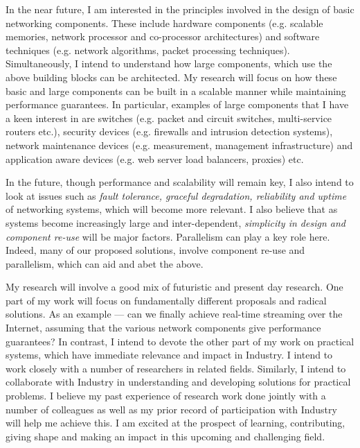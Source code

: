 \documentclass[10pt]{article}
\begin{document}
\begin{small}
In the near future, I am interested in the 
principles involved in the design of basic networking 
components. These include
hardware components (e.g. scalable memories, 
network processor and co-processor architectures) and 
software techniques (e.g. network algorithms, packet processing 
techniques). 
  Simultaneously, I intend to understand how large components, which use
the above building blocks can be architected.
My research will focus on how these basic and large
components can be built in a scalable manner while maintaining 
performance guarantees. 
In particular, examples of large components that I have a keen
interest in are switches 
(e.g. packet and circuit switches, multi-service routers etc.), 
security devices (e.g. firewalls and intrusion detection 
systems), network maintenance devices (e.g. measurement,
management infrastructure) and application aware devices
(e.g. web server load balancers, proxies) etc. 

In the future, though performance and scalability will remain key,
I also intend to look at issues such as {\it fault tolerance, graceful degradation,
reliability and uptime} of networking systems, which will become more relevant. 
I also believe that as systems become increasingly large and 
inter-dependent, {\it simplicity in design and component 
re-use} will be major factors.
Parallelism can play a key role here.
Indeed, many of our proposed solutions, involve component re-use and 
parallelism, which can aid and abet the above.


My research will involve a good mix of futuristic and present 
day research. 
One part of my work will focus on fundamentally different proposals and
radical solutions. As an example
--- can we finally achieve real-time streaming over the Internet,
assuming that the various network components give performance guarantees?
In contrast, I intend to devote the other part of my work 
on practical systems, which have immediate relevance and impact in Industry.
I intend to work closely with a number of
researchers in related fields. Similarly, I intend to
collaborate with Industry in understanding and developing solutions
for practical problems. I believe my past experience of research
work done jointly with a number of colleagues as well as my prior record
of participation with Industry will help me achieve this. 
I am excited at the
prospect of learning, contributing, giving shape and making an
impact in this upcoming and challenging field.  


\vspace{0.5cm}

\end{small}

\begin{footnotesize}




\end{footnotesize}
\end{document}
